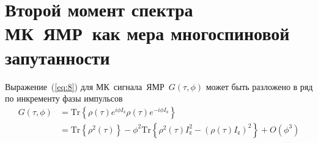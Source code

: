 \documentclass[utf8]{jetp}
\begin{document}
\section{Второй момент спектра МК~ЯМР~как мера многоспиновой запутанности}
\label{sec:4}

Выражение~(\ref{eq:8}) для МК~сигнала~ЯМР~$G(\tau,\phi)$ может быть разложено в ряд по инкременту фазы импульсов
%
\begin{equation}
  \begin{split}
    \label{eq:17}
    G(\tau,\phi)
    & = \mathrm{Tr} \left\{
      \rho(\tau) e^{i \phi I_\mathrm{z} }
      \rho(\tau) e^{-i\phi I_\mathrm{z}}
    \right\} \\
    & = \mathrm{Tr} \left\{ \rho^2(\tau) \right\}
    - \phi^2 \mathrm{Tr} \left\{
      \rho^2(\tau) I^2_\mathrm{z}
      - (\rho(\tau) I_\mathrm{z})^2
    \right\}
    + O(\phi^3)
  \end{split}
\end{equation}
%
\end{document}
